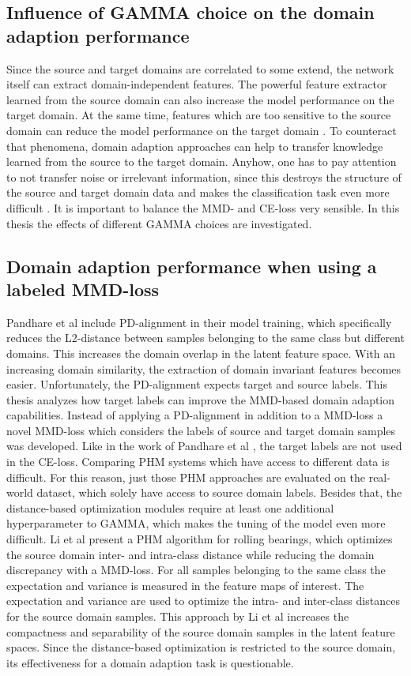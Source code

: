 \subsection{Influence of GAMMA choice on the domain adaption performance}
Since the source and target domains are correlated to some extend, the network itself can extract domain-independent features. The powerful feature extractor learned from the source domain can also increase the model performance on the target domain. At the same time, features which are too sensitive to the source domain can reduce the model performance on the target domain \cite{li2020}. To counteract that phenomena, domain adaption approaches can help to transfer knowledge learned from the source to the target domain. Anyhow, one has to pay attention to not transfer noise or irrelevant information, since this destroys the structure of the source and target domain data and makes the classification task even more difficult \cite{li2020}. It is important to balance the MMD- and CE-loss very sensible. In this thesis the effects of different GAMMA choices are investigated.

\subsection{Domain adaption performance when using a labeled MMD-loss}
Pandhare et al \cite{Pandhare2021} include PD-alignment in their model training, which specifically reduces the L2-distance between samples belonging to the same class but different domains. This increases the domain overlap in the latent feature space. With an increasing domain similarity, the extraction of domain invariant features becomes easier. Unfortunately, the PD-alignment expects target and source labels. This thesis analyzes how target labels can improve the MMD-based domain adaption capabilities. Instead of applying a PD-alignment in addition to a MMD-loss a novel MMD-loss which considers the labels of source and target domain samples was developed. Like in the work of Pandhare et al \cite{Pandhare2021}, the target labels are not used in the CE-loss. Comparing PHM systems which have access to different data is difficult. For this reason, just those PHM approaches are evaluated on the real-world dataset, which solely have access to source domain labels.  Besides that, the distance-based optimization modules require at least one additional hyperparameter to GAMMA, which makes the tuning of the model even more difficult. Li et al \cite{Li2018} present a PHM algorithm for rolling bearings, which optimizes the source domain inter- and intra-class distance while reducing the domain discrepancy with a MMD-loss. For all samples belonging to the same class the expectation and variance is measured in the feature maps of interest. The expectation and variance are used to optimize the intra- and inter-class distances for the source domain samples. This approach by Li et al increases the compactness and separability of the source domain samples in the latent feature spaces. Since the distance-based optimization is restricted to the source domain, its effectiveness for a domain adaption task is questionable.

